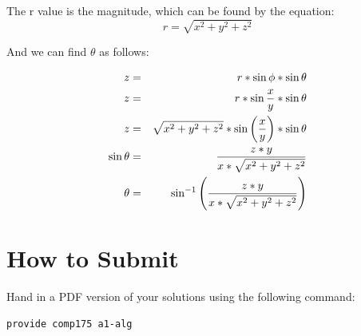 \documentclass[10pt,twocolumn]{article}
\begin{document}
The r value is the magnitude, which can be found by the equation: \\

\[ r = \sqrt{x^{2} + y^{2} + z^{2}} \]

And we can find $\theta$ as follows: 

\begin{eqnarray*}
z & = & r * \sin{\phi}*\sin{\theta} \\
z & = & r * \sin{{x}\over{y}}*\sin{\theta} \\
z & = & \sqrt{x^{2} + y^{2} + z^{2}} * \sin\left({{x}\over{y}}\right)*\sin{\theta} \\
\sin{\theta} & = & {z * y}\over{x * \sqrt{x^{2} + y^{2} + z^{2}}} \\
\theta & = & \sin^{-1}\left({{z * y}\over{x * \sqrt{x^{2} + y^{2} + z^{2}}}}\right)
\end{eqnarray*}
\vspace{2em}
\section{How to Submit}

Hand in a PDF version of your solutions using the following command:
\begin{center}
 {\tt provide comp175 a1-alg}
 \end{center}
\end{document}
